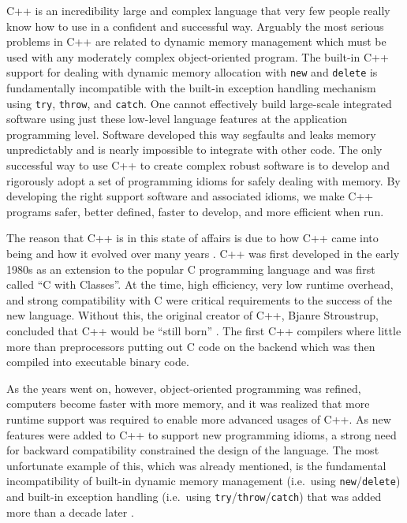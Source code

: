 \documentclass[pdf,ps2pdf,11pt]{SANDreport}
\begin{document}
C++ is an incredibility large and complex language that very few
people really know how to use in a confident and successful way.
Arguably the most serious problems in C++ are related to dynamic
memory management which must be used with any moderately complex
object-oriented program.  The built-in C++ support for dealing with
dynamic memory allocation with {}\texttt{new} and {}\texttt{delete} is
fundamentally incompatible with the built-in exception handling
mechanism using {}\texttt{try}, {}\texttt{throw}, and
{}\texttt{catch}.  One cannot effectively build large-scale integrated
software using just these low-level language features at the
application programming level.  Software developed this way segfaults
and leaks memory unpredictably and is nearly impossible to integrate
with other code.  The only successful way to use C++ to create complex
robust software is to develop and rigorously adopt a set of
programming idioms for safely dealing with memory.  By developing the
right support software and associated idioms, we make C++ programs
safer, better defined, faster to develop, and more efficient when run.

The reason that C++ is in this state of affairs is due to how C++ came
into being and how it evolved over many years {}\cite{stroustrup94,
stroustrup07}.  C++ was first developed in the early 1980s as an
extension to the popular C programming language and was first called
``C with Classes''.  At the time, high efficiency, very low runtime
overhead, and strong compatibility with C were critical requirements
to the success of the new language.  Without this, the original
creator of C++, Bjanre Stroustrup, concluded that C++ would be ``still
born'' {}\cite{stroustrup97}.  The first C++ compilers where little
more than preprocessors putting out C code on the backend which was
then compiled into executable binary code.

As the years went on, however, object-oriented programming was
refined, computers become faster with more memory, and it was realized
that more runtime support was required to enable more advanced usages
of C++.  As new features were added to C++ to support new programming
idioms, a strong need for backward compatibility constrained the
design of the language.  The most unfortunate example of this, which
was already mentioned, is the fundamental incompatibility of built-in
dynamic memory management (i.e.\ using
{}\texttt{new}/{}\texttt{delete}) and built-in exception handling
(i.e.\ using {}\texttt{try}/{}\texttt{throw}/{}\texttt{catch}) that
was added more than a decade later {}\cite{stroustrup94}.
\end{document}
